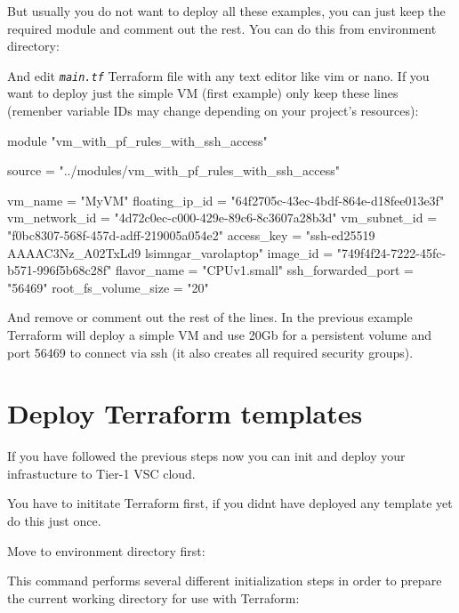 But usually you do not want to deploy all these examples, you can just keep the required module and comment out the rest. You can do this from environment directory:

\begin{prompt}
\end{prompt}

And edit \texttt{\emph{main.tf}} Terraform file with any text editor like vim or nano.
If you want to deploy just the simple VM (first example) only keep these lines (remenber variable IDs may change depending on your project's resources):

\begin{code}{}
 module "vm_with_pf_rules_with_ssh_access" {
  source   = "../modules/vm_with_pf_rules_with_ssh_access"

  vm_name              = "MyVM"
  floating_ip_id       = "64f2705c-43ec-4bdf-864e-d18fee013e3f"
  vm_network_id        = "4d72c0ec-c000-429e-89c6-8c3607a28b3d"
  vm_subnet_id         = "f0bc8307-568f-457d-adff-219005a054e2"
  access_key           = "ssh-ed25519 AAAAC3Nz_A02TxLd9 lsimngar_varolaptop"
  image_id             = "749f4f24-7222-45fc-b571-996f5b68c28f"
  flavor_name          = "CPUv1.small"
  ssh_forwarded_port   = "56469"
  root_fs_volume_size  = "20"
}
\end{code}

And remove or comment out the rest of the lines.
In the previous example Terraform will deploy a simple VM and use 20Gb for a persistent volume and port 56469 to connect via ssh (it also creates all required security groups).

\section{Deploy Terraform templates}\label{sec:deploy-terraform-templates}
If you have followed the previous steps now you can init and deploy your infrastucture to
Tier-1 VSC cloud.

You have to inititate Terraform first, if you didnt have deployed any template yet do this just once.

Move to environment directory first:

\begin{prompt}
\end{prompt}

This command performs several different initialization steps in order to prepare the
current working directory for use with Terraform:


